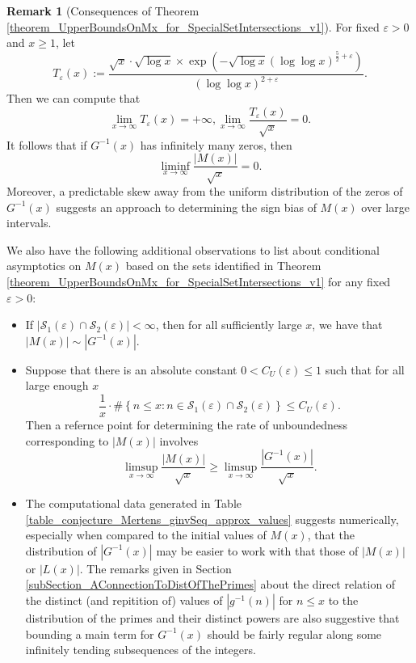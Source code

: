 \documentclass[11pt,reqno,a4letter]{article}
\numberwithin{figure}{section}
\numberwithin{table}{section}
\theoremstyle{plain}
\numberwithin{theorem}{section}
\theoremstyle{definition}
\newtheorem{remark}[theorem]{Remark}
\begin{document}
\begin{remark}[Consequences of Theorem \ref{theorem_UpperBoundsOnMx_for_SpecialSetIntersections_v1}]
For fixed $\varepsilon > 0$ and $x \geq 1$, let 
\[
T_{\varepsilon}(x) := \frac{\sqrt{x} \cdot \sqrt{\log x} \times \exp\left(-\sqrt{\log x} 
     (\log\log x)^{\frac{5}{2} + \varepsilon}\right)}{ 
     (\log\log x)^{2 + \varepsilon}}.
\]
Then we can compute that 
\[
\lim_{x \rightarrow \infty} T_{\varepsilon}(x) = +\infty, 
     \lim_{x \rightarrow \infty} \frac{T_{\varepsilon}(x)}{\sqrt{x}} = 0. 
\]
It follows that if $G^{-1}(x)$ has infinitely many zeros, then 
\[
\liminf_{x \rightarrow \infty} \frac{|M(x)|}{\sqrt{x}} = 0. 
\]
Moreover, a predictable skew away from the uniform distribution of 
the zeros of $G^{-1}(x)$ suggests an approach to determining the sign bias 
of $M(x)$ over large intervals. 

We also have the following additional observations to list about conditional 
asymptotics on $M(x)$ based on the sets identified in 
Theorem \ref{theorem_UpperBoundsOnMx_for_SpecialSetIntersections_v1} 
for any fixed $\varepsilon > 0$: 
\begin{itemize} 

\item 
If $|\mathcal{S}_1(\varepsilon) \cap \mathcal{S}_2(\varepsilon)| < \infty$, then 
for all sufficiently large $x$, we have that 
$|M(x)| \sim |G^{-1}(x)|$. 

\item 
Suppose that there is an absolute constant $0 < C_U(\varepsilon) \leq 1$ such that 
for all large enough $x$ 
\[
\frac{1}{x} \cdot \#\left\{n \leq x: n \in \mathcal{S}_1(\varepsilon) \cap \mathcal{S}_2(\varepsilon) 
     \right\} \leq C_U(\varepsilon). 
\]
Then a refernce point for determining the rate of unboundedness corresponding to $|M(x)|$ 
involves 
\[
\limsup_{x \rightarrow \infty} \frac{|M(x)|}{\sqrt{x}} \geq 
     \limsup_{x \rightarrow \infty} \frac{|G^{-1}(x)|}{\sqrt{x}}. 
\]

\item
The computational data generated in 
Table \ref{table_conjecture_Mertens_ginvSeq_approx_values} 
suggests numerically, especially when compared to the initial values of $M(x)$, 
that the distribution of $|G^{-1}(x)|$ may be easier to work with 
that those of $|M(x)|$ or $|L(x)|$. 
The remarks given in Section \ref{subSection_AConnectionToDistOfThePrimes} 
about the direct relation of the distinct (and repitition of) values of $|g^{-1}(n)|$ 
for $n \leq x$ to the distribution of the primes and their distinct powers are 
also suggestive that bounding a main term for $G^{-1}(x)$ should be fairly 
regular along some infinitely tending subsequences of the integers. 

\end{itemize} 
\end{remark} 
\end{document}

